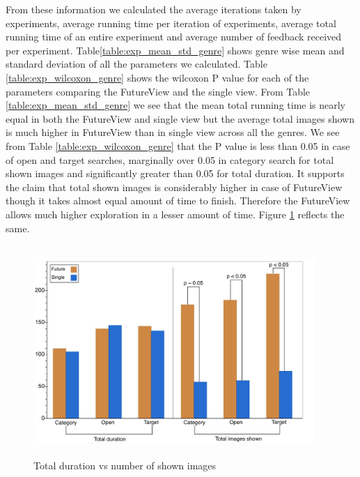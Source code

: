 \documentclass[english]{tktltiki}
\begin{document}
From these information we calculated the average iterations taken by experiments, average running time per iteration of experiments, average total running time of an entire experiment and average number of feedback received per experiment. Table\ref{table:exp_mean_std_genre} shows genre wise mean and standard deviation of all the parameters we calculated. Table \ref{table:exp_wilcoxon_genre} shows the wilcoxon P value for each of the parameters comparing the FutureView and the single view. From Table \ref{table:exp_mean_std_genre} we see that the mean total running time is nearly equal in both the FutureView and single view but the average total images shown is much higher in FutureView than in single view across all the genres. We see from Table \ref{table:exp_wilcoxon_genre} that the P value is less than 0.05 in case of open and target searches, marginally over 0.05 in category search for total shown images and significantly greater than 0.05 for total duration. It supports the claim that total shown images is considerably higher in case of FutureView though it takes almost equal amount of time to finish. Therefore the FutureView allows much higher exploration in a lesser amount of time. Figure \ref{dur_vs_img} reflects the same.

\begin{figure}[h!]
  \centering
    \includegraphics[width=0.95\textwidth,height=8cm]{figures/Bar_Chart__Duration_vs_Images.jpg}
    \caption{Total duration vs number of shown images}
    \label{dur_vs_img}
\end{figure}
\end{document}
